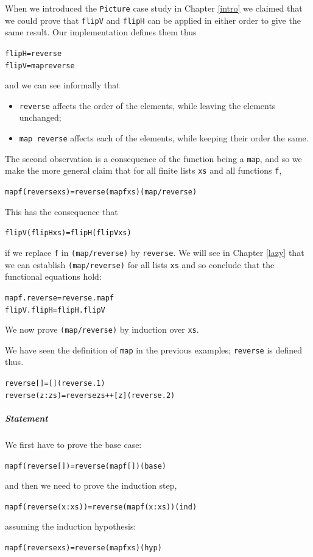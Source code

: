 When we introduced the \texttt{Picture} case study
in Chapter \ref{intro} we claimed that we could prove that 
\texttt{flipV} and \texttt{flipH}
can be applied in either order to give the same result. Our
implementation defines them thus
\begin{alltt}
flipH = reverse
flipV = map reverse
\end{alltt}
and we can see informally that 
\begin{itemize}
\item
\texttt{reverse} affects the order of the elements, while leaving the
elements unchanged;
\item 
\texttt{map reverse} affects each of the elements, while keeping their
order the same.
\end{itemize}
The second observation is a consequence of the function being a
\texttt{map}, and so we make the more general claim that for all finite lists \texttt{xs} and all
functions \texttt{f},
\begin{alltt}
map f (reverse xs) = reverse (map f xs)\hfill(map/reverse)
\end{alltt}
This has the consequence that
\begin{alltt}
flipV (flipH xs) = flipH (flipV xs)
\end{alltt}
if we replace \texttt{f} in \texttt{(map/reverse)}
by \texttt{reverse}. We will see in Chapter \ref{lazy} that we can
establish
\texttt{(map/reverse)}
for all lists \texttt{xs} and so conclude that the functional equations
hold:
\begin{alltt}
map f . reverse = reverse . map f
flipV . flipH   = flipH . flipV
\end{alltt}
We now prove \texttt{(map/reverse)}
by induction over \texttt{xs}.

We have seen the definition of \texttt{map} in the previous examples;
\texttt{reverse} is defined thus.
\begin{alltt}
reverse []     = []\hfill(reverse.1)
reverse (z:zs) = reverse zs ++ [z]\hfill(reverse.2)
\end{alltt}

\subparagraph{Statement} We first have to prove the base case:
\begin{alltt}
map f (reverse []) = reverse (map f [])\hfill(base)
\end{alltt}
and then we need to prove the induction step,
\begin{alltt}
map f (reverse (x:xs)) = reverse (map f (x:xs))\hfill(ind)
\end{alltt}
assuming the induction hypothesis:
\begin{alltt}
map f (reverse xs) = reverse (map f xs)\hfill(hyp)
\end{alltt}

